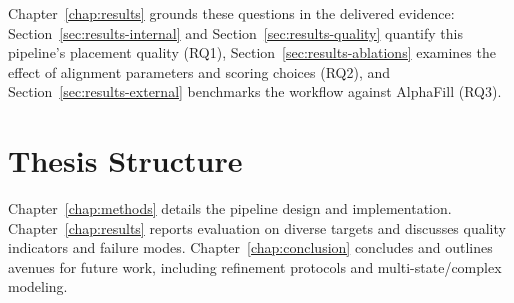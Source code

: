 Chapter~\ref{chap:results} grounds these questions in the delivered evidence: Section~\ref{sec:results-internal} and Section~\ref{sec:results-quality} quantify this pipeline's placement quality (RQ1), Section~\ref{sec:results-ablations} examines the effect of alignment parameters and scoring choices (RQ2), and Section~\ref{sec:results-external} benchmarks the workflow against AlphaFill (RQ3).

\section{Thesis Structure}
Chapter~\ref{chap:methods} details the pipeline design and implementation. Chapter~\ref{chap:results} reports evaluation on diverse targets and discusses quality indicators and failure modes. Chapter~\ref{chap:conclusion} concludes and outlines avenues for future work, including refinement protocols and multi-state/complex modeling.
